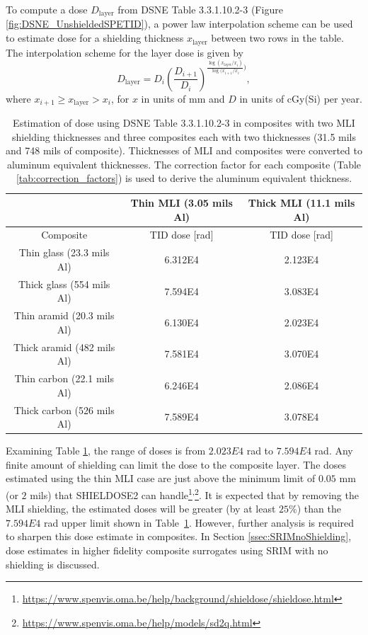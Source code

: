 \documentclass{hitec}
\begin{document}
To compute a dose $D_{\text{layer}}$ from DSNE Table 3.3.1.10.2-3 (Figure \ref{fig:DSNE_UnshieldedSPETID}), a power law interpolation scheme can be used to estimate dose for a shielding thickness $x_{\text{layer}}$ between two rows in the table. The interpolation scheme for the layer dose is given by
\begin{equation}
D_{\text{layer}} = D_i\left(\frac{D_{i+1}}{D_i}\right)^{\frac{\log(x_{\text{layer}}/x_i)}{\log(x_{i+1}/x_i})},
\end{equation}
where $x_{i+1} \ge x_{\text{layer}} > x_i$, for $x$ in units of mm and $D$ in units of cGy(Si) per year.

\begin{table}[h]\centering
	\caption{Estimation of dose using DSNE Table 3.3.1.10.2-3 in composites with two MLI shielding thicknesses and three composites each with two thicknesses (31.5 mils and 748 mils of composite). Thicknesses of MLI and composites were converted to aluminum equivalent thicknesses. The correction factor for each composite (Table \ref{tab:correction_factors}) is used to derive the aluminum equivalent thickness.}\label{tab:dose_composite_DSNE}
	\begin{tabular}{|c | c | c |}\hline
			 &Thin MLI (3.05 mils Al) & Thick MLI (11.1 mils Al) \\\hline
		Composite & TID dose [rad] &  TID dose [rad] \\\hline
		Thin glass (23.3 mils Al)   & 6.312E4 & 2.123E4 \\\hline
		Thick glass (554 mils Al)   & 7.594E4 & 3.083E4 \\\hline
		Thin aramid (20.3 mils Al)  & 6.130E4 & 2.023E4\\\hline
		Thick aramid (482 mils Al)  & 7.581E4 & 3.070E4\\\hline
		Thin carbon (22.1 mils Al)  & 6.246E4 & 2.086E4\\\hline
		Thick carbon (526 mils Al) & 7.589E4 & 3.078E4\\\hline
	\end{tabular}
\end{table}

Examining Table \ref{tab:dose_composite_DSNE}, the range of doses is from $2.023E4$ rad to $7.594E4$ rad. Any finite amount of shielding can limit the dose to the composite layer. The doses estimated using the thin MLI case are just above the minimum limit of $0.05$ mm (or $2$ mils) that SHIELDOSE2 can handle\footnote{\url{https://www.spenvis.oma.be/help/background/shieldose/shieldose.html}}\textsuperscript{,}\footnote{\url{https://www.spenvis.oma.be/help/models/sd2q.html}}. It is expected that by removing the MLI shielding, the estimated doses will be greater (by at least $25\%$) than the $7.594E4$ rad upper limit shown in Table~\ref{tab:dose_composite_DSNE}. However, further analysis is required to sharpen this dose estimate in composites. In Section \ref{ssec:SRIMnoShielding}, dose estimates in higher fidelity composite surrogates using SRIM with no shielding is discussed.
\end{document}
